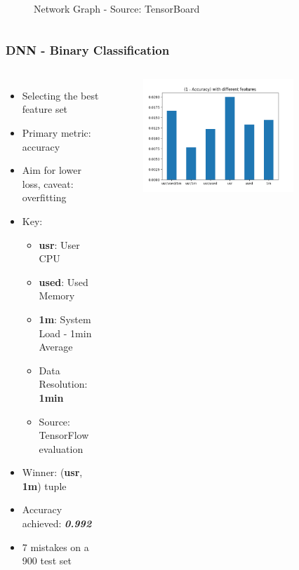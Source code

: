 \documentclass[aspectratio=169,11pt,hyperref={colorlinks=true}]{beamer}
\begin{document}
\begin{frame}
\begin{columns}
\begin{figure}
\begin{center}
             \caption{Network Graph - Source: TensorBoard}
        \end{center}
        \end{figure}
    \end{columns}
\end{frame}

\begin{frame}
    \frametitle{DNN - Binary Classification}
    \begin{columns}
        \begin{itemize}
            \item{Selecting the best feature set}
            \item{Primary metric: accuracy}
            \item{Aim for lower loss, caveat: overfitting}
            \item{Key:}
            \begin{itemize}
              \item{\textbf{usr}: User CPU}
              \item{\textbf{used}: Used Memory}
              \item{\textbf{1m}: System Load - 1min Average}
              \item{Data Resolution: \textbf{1min}}
              \item{Source: TensorFlow evaluation}
            \end{itemize}
            \item{Winner: (\textbf{usr}, \textbf{1m}) tuple}
            \item{Accuracy achieved: \emph{\textbf{0.992}}}
            \item{7 mistakes on a 900 test set}
        \end{itemize}
        \begin{center}
        \begin{figure}
          \includegraphics[width=0.8\textwidth,height=0.4\textheight]{graphs/accuracy_by_feature-status.png}

\end{figure}
\end{center}
\end{columns}
\end{frame}
\end{document}

